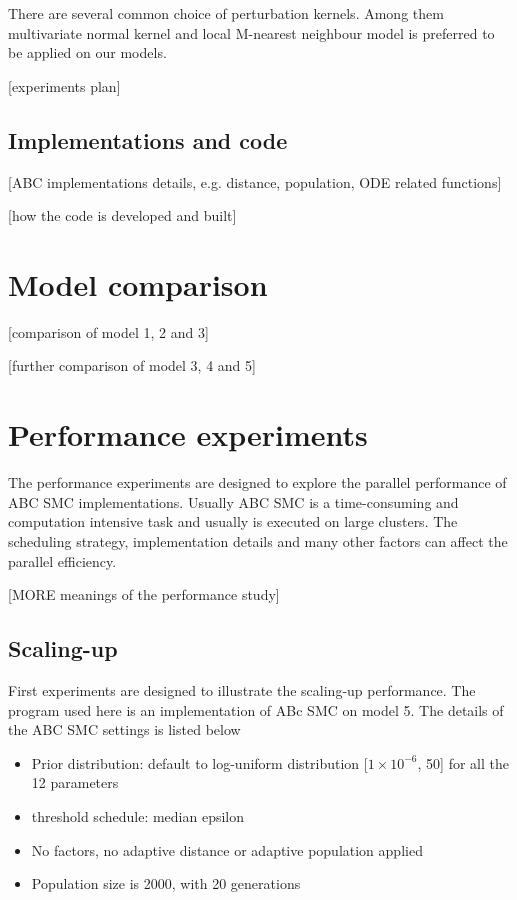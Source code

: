 \documentclass[12pt,a4paper]{report}
\begin{document}
There are several common choice of perturbation kernels. Among them multivariate normal kernel and local M-nearest neighbour model is preferred to be applied on our models.

[experiments plan]

\subsection{Implementations and code}

[ABC implementations details, e.g. distance, population, ODE related functions]

[how the code is developed and built]

\section{Model comparison}

[comparison of model 1, 2 and 3]

[further comparison of model 3, 4 and 5]

\section{Performance experiments}

The performance experiments are designed to explore the parallel performance of ABC SMC implementations. Usually ABC SMC is a time-consuming and computation intensive task and usually is executed on large clusters. The scheduling strategy, implementation details and many other factors can affect the parallel efficiency.

[MORE meanings of the performance study]

\subsection{Scaling-up}

First experiments are designed to illustrate the scaling-up performance. The program used here is an implementation of ABc SMC on model 5. The details of the ABC SMC settings is listed below

\begin{itemize}
    \item Prior distribution: default to log-uniform distribution [$1\times 10^{-6}$, 50] for all the 12 parameters
    \item threshold schedule: median epsilon
    \item No factors, no adaptive distance or adaptive population applied
    \item Population size is 2000, with 20 generations
\end{itemize}
\end{document}
